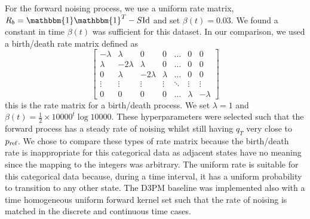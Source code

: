 \documentclass{article}
\begin{document}
For the forward noising process, we use a uniform rate matrix, $R_b = \mathbbm{1} \mathbbm{1}^T - S \mathrm{Id}$ and set $\beta(t) = 0.03$. We found a constant in time $\beta(t)$ was sufficient for this dataset. In our comparison, we used a birth/death rate matrix defined as 
\begin{equation}
    \begin{bmatrix}
    -\lambda&\lambda&0&0 & \dots &0 & 0\\
    \lambda & -2\lambda & \lambda & 0 & \dots & 0 & 0\\
    0 & \lambda & -2 \lambda & \lambda & \dots & 0 & 0\\
    \vdots & \vdots & \vdots & \vdots & \ddots & \vdots & \vdots\\
    0 & 0 & 0 & 0& \dots & \lambda & -\lambda
    \end{bmatrix}
\end{equation}
this is the rate matrix for a birth/death process. We set $\lambda = 1$ and $\beta(t) = \frac{1}{2} \times 10000^t \log 10000$. These hyperparameters were selected such that the forward process has a steady rate of noising whilst still having $q_T$ very close to $p_{\textrm{ref}}$. We chose to compare these types of rate matrix because the birth/death rate is inappropriate for this categorical data as adjacent states have no meaning since the mapping to the integers was arbitrary. The uniform rate is suitable for this categorical data because, during a time interval, it has a uniform probability to transition to any other state. The D3PM baseline was implemented also with a time homogeneous uniform forward kernel set such that the rate of noising is matched in the discrete and continuous time cases.\\
\end{document}
